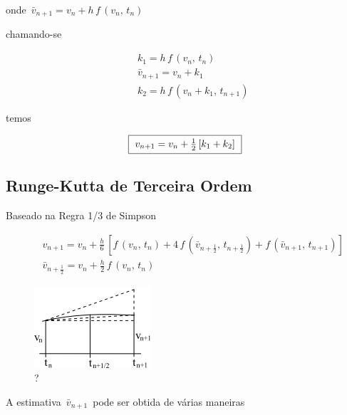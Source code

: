 onde $ \, \bar{v}_{n+1} = v_n + h \, f \, (v_n, \, t_n) \, $

chamando-se

\begin{eqnarray}
 \label{cap6:sec3:eq12}
 & & k_1 = h \, f \, (v_n, \, t_n) \\
 \label{cap6:sec3:eq13}
 & & \bar{v}_{n+1} = v_n + k_1 \\
 \label{cap6:sec3:eq14}
 & & k_2 = h \, f \, (v_n + k_1, \, t_{n+1})
\end{eqnarray}

temos

\begin{equation}
 \label{cap6:sec3:eq15}
 \mbox{ \framebox{ $ v_{n+1} = v_n + \frac{1}{2} \, [k_1 + k_2] $ } }
\end{equation}

\subsection{Runge-Kutta de Terceira Ordem}

Baseado na Regra 1/3 de Simpson

\begin{eqnarray}
 \label{cap6:sec3:eq16}
 && v_{n+1} = v_n + \frac{h}{6} \, [f \, (v_n, \, t_n) + 4 \, f \, (\bar{v}_{n+\frac{1}{2}}, \, t_{n+\frac{1}{2}}) + f \, (\bar{v}_{n+1}, \, t_{n+1})] \\
 \label{cap6:sec3:eq17}
 && \bar{v}_{n+\frac{1}{2}} = v_n + \frac{h}{2} \, f \, (v_n, \, t_n)
\end{eqnarray}

\begin{figure}[htb]
 \centering
 \includegraphics[scale=1.0]{capitulos/capitulo6/figuras/met_runge_kutta3.png}
 \caption{?}
 \label{fig:met_runge_kutta3}
\end{figure}

A estimativa $ \, \bar{v}_{n+1} \, $ pode ser obtida de várias maneiras

